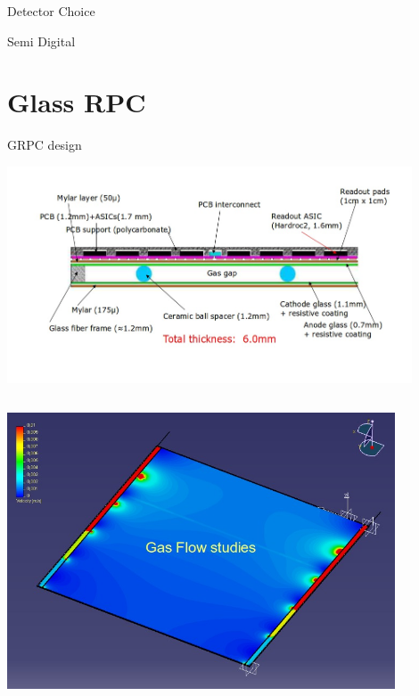 \documentclass[10pt]{beamer}
\begin{document}
\begin{frame}{Detector Choice}
\begin{block}{  Semi Digital}
  \end{block} 

\end{frame}
\section{Glass RPC }
\begin{frame}{GRPC design}

  \centerline{\includegraphics[width=0.9\textwidth,height=0.4\textheight]{jpg/GRPCSchema}}
  \pause   

 \begin{columns}
      \begin{column}{0.45\textwidth}
       \centerline{\includegraphics[width=0.9\textwidth]{jpg/GasFlow}}
      \end{column}
\pause
      \begin{column}{0.45\textwidth}


\end{column}
\end{columns}
\end{frame}
\end{document}
